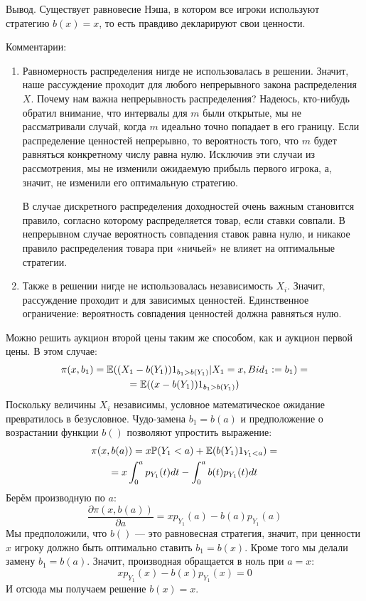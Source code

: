 \begin{enumerate}
Вывод. Существует равновесие Нэша, в котором все игроки используют стратегию $ b(x)=x $, то есть правдиво декларируют свои ценности.

Комментарии:
\begin{enumerate}
\item Равномерность распределения нигде не использовалась в решении. Значит, наше рассуждение проходит для любого непрерывного закона распределения $ X $.
Почему нам важна непрерывность распределения? Надеюсь, кто-нибудь обратил внимание, что интервалы для $ m $ были открытые, мы не рассматривали случай, когда $ m $ идеально точно попадает в его границу. Если распределение ценностей непрерывно, то вероятность того, что $ m $ будет равняться конкретному числу равна нулю. Исключив эти случаи из рассмотрения, мы не изменили ожидаемую прибыль первого игрока, а, значит, не изменили его оптимальную стратегию.

В случае дискретного распределения доходностей очень важным становится правило, согласно которому распределяется товар, если ставки совпали. В непрерывном случае вероятность совпадения ставок равна нулю, и никакое правило распределения товара при «ничьей» не влияет на оптимальные стратегии.
\item Также в решении нигде не использовалась независимость $ X_{i} $. Значит, рассуждение проходит и для зависимых ценностей. Единственное ограничение: вероятность совпадения ценностей должна равняться нулю.
\end{enumerate}


\begin{myex}
Можно решить аукцион второй цены таким же способом, как и аукцион первой цены. В этом случае:
\begin{multline}
\pi(x,b_{1})=\mathbb{E}((X_{1}-b(Y_{1}))1_{b_{1}>b(Y_{1})}|X_{1}=x,Bid_{1}:=b_{1})=\\
=\mathbb{E}((x-b(Y_{1}))1_{b_{1}>b(Y_{1})})
\end{multline}
Поскольку величины $ X_{i} $ независимы, условное математическое ожидание превратилось в безусловное. Чудо-замена $ b_{1}=b(a) $ и предположение о возрастании функции $ b() $ позволяют упростить выражение:
\begin{multline}
\pi(x,b(a))=x\mathbb{P}(Y_{1}<a)+\mathbb{E}(b(Y_{1})1_{Y_{1}<a})=\\
=x\int_{0}^{a}p_{Y_{1}}(t)dt-\int_{0}^{a}b(t)p_{Y_{1}}(t)dt
\end{multline}
Берём производную по $ a $:
\begin{equation}
\frac{\partial \pi(x,b(a))}{\partial a}=xp_{Y_{1}}(a)-b(a)p_{Y_{1}}(a)
\end{equation}
Мы предположили, что $ b() $ — это равновесная стратегия, значит, при ценности $ x $ игроку должно быть оптимально ставить $ b_{1}=b(x) $. Кроме того мы делали замену $ b_{1}=b(a) $. Значит, производная обращается в ноль при $ a=x $:
\begin{equation}
xp_{Y_{1}}(x)-b(x)p_{Y_{1}}(x)=0
\end{equation}
И отсюда мы получаем решение $b(x)=x$.


\end{myex}
\end{enumerate}
